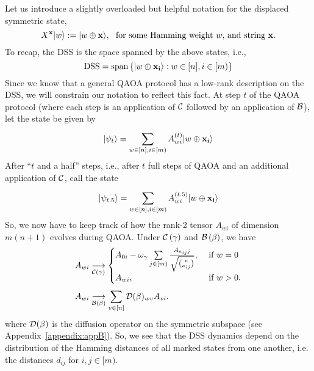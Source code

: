 \documentclass[11pt]{article}
\begin{document}
Let us introduce a slightly overloaded but helpful notation for the displaced symmetric state,
\begin{equation}
  X^{\str{x}}\ket{w} := \ket{w\oplus \str{x}},\ \text{ for some Hamming weight $w$, and string $\str{x}$.}
\end{equation}
To recap, the DSS is the space spanned by the above states, i.e.,
\begin{equation}
  \text{DSS} = \text{span}\left\{|w\oplus\mathbf{x_i}\rangle: w\in [n], i\in [m)\right\}
  \label{eq:DSSdefn}
\end{equation}
Since we know that a general QAOA protocol has a low-rank description on the DSS, we will constrain our notation to reflect this fact. At step $t$ of the QAOA protocol (where each step is an application of $\mathcal{C}$ followed by an application of $\mathcal{B}$), let the state be given by
\begin{equation}
  |\psi_t\rangle = \sum\limits_{w\in [n],i\in [m)}^{}A^{(t)}_{wi}|w\oplus\mathbf{x_i}\rangle
\end{equation}
After ``$t$ and a half'' steps, i.e., after $t$ full steps of QAOA and an additional application of $\mathcal{C}$, call the state
\begin{equation}
  |\psi_{t.5}\rangle = \sum\limits_{w\in [n],i\in [m)}^{}A^{(t.5)}_{wi}|w\oplus\mathbf{x_i}\rangle
\end{equation}
So, we now have to keep track of how the rank-2 tensor $A_{wi}$ of dimension $m(n+1)$ evolves during QAOA. Under $\mathcal{C}\left(\gamma\right)$ and $\mathcal{B}\left(\beta\right)$, we have
\begin{align}
  \label{eq:transC}
  A_{wi} &\underset{\mathcal{C}\left(\gamma\right)}{\longrightarrow}
  \begin{cases}
    A_{0i} - \omega_\gamma\sum\limits_{j\in [m)}^{}\frac{A_{a_{ij} j}}{\sqrt{\binom{n}{a_{ij}}}}, &\text{ if } w=0\\
    A_{wi}, &\text{ if } w>0.
  \end{cases}\\
  \label{eq:transB}
  A_{wi} &\underset{\mathcal{B}\left(\beta\right)}{\longrightarrow} \sum\limits_{v\in [n]}^{}\mathcal{D}(\beta)_{wv}A_{v i}.
\end{align}
where $\mathcal{D}(\beta)$ is the diffusion operator on the symmetric subspace (see Appendix~\ref{appendix:appB}). So, we see that the DSS dynamics depend on the distribution of the Hamming distances of all marked states from one another, i.e. the distances $d_{ij}$ for $i,j\in [m)$.
\end{document}

